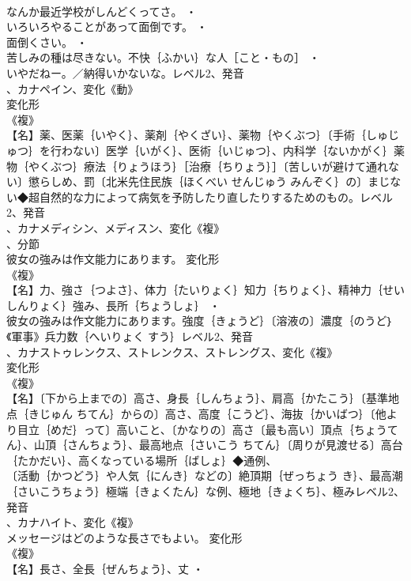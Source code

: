 \documentclass[8pt]{extreport}
\begin{document}
\begin{CJK}{UTF8}{min}
\\	なんか最近学校がしんどくってさ。 ・
\\	いろいろやることがあって面倒です。 ・
\\	面倒くさい。 ・
\\	苦しみの種は尽きない。不快｛ふかい｝な人［こと・もの］ ・
\\	いやだねー。／納得いかないな。レベル2、発音
\\	、カナペイン、変化《動》
\\	変化形 
\\	《複》
\\	【名】薬、医薬｛いやく｝、薬剤｛やくざい｝、薬物｛やくぶつ｝〔手術｛しゅじゅつ｝を行わない〕医学｛いがく｝、医術｛いじゅつ｝、内科学｛ないかがく｝薬物｛やくぶつ｝療法｛りょうほう｝［治療｛ちりょう｝］〔苦しいが避けて通れない〕懲らしめ、罰〔北米先住民族｛ほくべい せんじゅう みんぞく｝の〕まじない◆超自然的な力によって病気を予防したり直したりするためのもの。レベル2、発音
\\	、カナメディシン、メディスン、変化《複》
\\	、分節
\\	彼女の強みは作文能力にあります。	変化形 
\\	《複》
\\	【名】力、強さ｛つよさ｝、体力｛たいりょく｝知力｛ちりょく｝、精神力｛せいしんりょく｝強み、長所｛ちょうしょ｝ ・
\\	彼女の強みは作文能力にあります。強度｛きょうど｝〔溶液の〕濃度｛のうど｝《軍事》兵力数｛へいりょく すう｝レベル2、発音
\\	、カナストゥレンクス、ストレンクス、ストレングス、変化《複》
\\	変化形 
\\	《複》
\\	【名】〔下から上までの〕高さ、身長｛しんちょう｝、肩高｛かたこう｝〔基準地点｛きじゅん ちてん｝からの〕高さ、高度｛こうど｝、海抜｛かいばつ｝〔他より目立｛めだ｝って〕高いこと、〔かなりの〕高さ〔最も高い〕頂点｛ちょうてん｝、山頂｛さんちょう｝、最高地点｛さいこう ちてん｝〔周りが見渡せる〕高台｛たかだい｝、高くなっている場所｛ばしょ｝◆通例、
\\	〔活動｛かつどう｝や人気｛にんき｝などの〕絶頂期｛ぜっちょう き｝、最高潮｛さいこうちょう｝極端｛きょくたん｝な例、極地｛きょくち｝、極みレベル2、発音
\\	、カナハイト、変化《複》
\\	メッセージはどのような長さでもよい。	変化形 
\\	《複》
\\	【名】長さ、全長｛ぜんちょう｝、丈 ・

\end{CJK}
\end{document}

